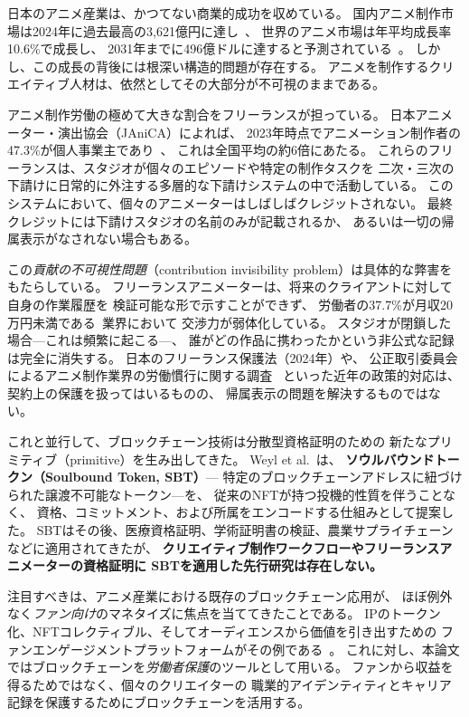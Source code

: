 
日本のアニメ産業は、かつてない商業的成功を収めている。
国内アニメ制作市場は2024年に過去最高の3{,}621億円に達し~\cite{tdb2025anime}、
世界のアニメ市場は年平均成長率10.6\%で成長し、
2031年までに496億ドルに達すると予測されている~\cite{mordor2026anime}。
しかし、この成長の背後には根深い構造的問題が存在する。
アニメを制作するクリエイティブ人材は、依然としてその大部分が不可視のままである。

アニメ制作労働の極めて大きな割合をフリーランスが担っている。
日本アニメーター・演出協会（JAniCA）によれば、
2023年時点でアニメーション制作者の47.3\%が個人事業主であり~\cite{janica2023survey}、
これは全国平均の約6倍にあたる。
これらのフリーランスは、スタジオが個々のエピソードや特定の制作タスクを
二次・三次の下請けに日常的に外注する多層的な下請けシステムの中で活動している。
このシステムにおいて、個々のアニメーターはしばしばクレジットされない。
最終クレジットには下請けスタジオの名前のみが記載されるか、
あるいは一切の帰属表示がなされない場合もある。

この\textit{貢献の不可視性問題}（contribution invisibility problem）は具体的な弊害をもたらしている。
フリーランスアニメーターは、将来のクライアントに対して自身の作業履歴を
検証可能な形で示すことができず、
労働者の37.7\%が月収20万円未満である~\cite{nafca2024labor}業界において
交渉力が弱体化している。
スタジオが閉鎖した場合---これは頻繁に起こる---、
誰がどの作品に携わったかという非公式な記録は完全に消失する。
日本のフリーランス保護法（2024年）や、
公正取引委員会によるアニメ制作業界の労働慣行に関する調査~\cite{jftc2025anime}
といった近年の政策的対応は、契約上の保護を扱ってはいるものの、
帰属表示の問題を解決するものではない。

これと並行して、ブロックチェーン技術は分散型資格証明のための
新たなプリミティブ（primitive）を生み出してきた。
Weyl et al.~\cite{buterin2022decentralized}は、
\textbf{ソウルバウンドトークン（Soulbound Token, SBT）}---
特定のブロックチェーンアドレスに紐づけられた譲渡不可能なトークン---を、
従来のNFTが持つ投機的性質を伴うことなく、
資格、コミットメント、および所属をエンコードする仕組みとして提案した。
SBTはその後、医療資格証明、学術証明書の検証、農業サプライチェーンなどに適用されてきたが、
\textbf{クリエイティブ制作ワークフローやフリーランスアニメーターの資格証明に
SBTを適用した先行研究は存在しない。}

注目すべきは、アニメ産業における既存のブロックチェーン応用が、
ほぼ例外なく\textit{ファン向け}のマネタイズに焦点を当ててきたことである。
IPのトークン化、NFTコレクティブル、そしてオーディエンスから価値を引き出すための
ファンエンゲージメントプラットフォームがその例である~\cite{fourpillars2025anime,animechain2024whitepaper}。
これに対し、本論文ではブロックチェーンを\textit{労働者保護}のツールとして用いる。
ファンから収益を得るためではなく、個々のクリエイターの
職業的アイデンティティとキャリア記録を保護するためにブロックチェーンを活用する。

